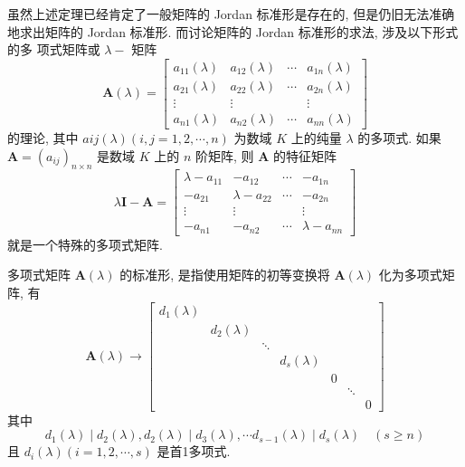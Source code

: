 \par 虽然上述定理已经肯定了一般矩阵的 Jordan 标准形是存在的, 但是仍旧无法准确
地求出矩阵的 Jordan 标准形. 而讨论矩阵的 Jordan 标准形的求法, 涉及以下形式的多
项式矩阵或 $\lambda -$ 矩阵
$$
    \bm{A}(\lambda) = \begin{bmatrix}
        a_{11}(\lambda) & a_{12}(\lambda) & \cdots & a_{1n}(\lambda) \\
        a_{21}(\lambda) & a_{22}(\lambda) & \cdots & a_{2n}(\lambda) \\
        \vdots          & \vdots          &        & \vdots          \\
        a_{n1}(\lambda) & a_{n2}(\lambda) & \cdots & a_{nn}(\lambda)
    \end{bmatrix}
$$
的理论, 其中 $a{ij}(\lambda)(i, j = 1, 2, \cdots, n)$ 为数域 $K$ 上的纯量 $\lambda$ 的多项式. 如果 $\bm{A} = (a_{ij})_{n\times n}$
是数域 $K$ 上的 $n$ 阶矩阵, 则 $\bm{A}$ 的特征矩阵
$$
    \lambda\bm{I} - \bm{A} = \begin{bmatrix}
        \lambda - a_{11} & -a_{12}          & \cdots & -a_{1n}          \\
        -a_{21}          & \lambda - a_{22} & \cdots & -a_{2n}          \\
        \vdots           & \vdots           &        & \vdots           \\
        -a_{n1}          & -a_{n2}          & \cdots & \lambda - a_{nn}
    \end{bmatrix}
$$
就是一个特殊的多项式矩阵.
\par 多项式矩阵 $\bm{A}(\lambda)$ 的标准形, 是指使用矩阵的初等变换将 $\bm{A}(\lambda)$ 化为多项式矩阵, 有
$$
    \bm{A}(\lambda) \to \begin{bmatrix}
        d_1(\lambda) &              &        &              &   &        &   \\
                     & d_2(\lambda) &        &              &   &        &   \\
                     &              & \ddots &              &   &        &   \\
                     &              &        & d_s(\lambda) &   &        &   \\
                     &              &        &              & 0 &        &   \\
                     &              &        &              &   & \ddots &   \\
                     &              &        &              &   &        & 0
    \end{bmatrix}
$$
其中
$$
    d_1(\lambda) \mid d_2(\lambda), d_2(\lambda) \mid d_3(\lambda), \cdots d_{s-1}(\lambda) \mid d_s(\lambda) \quad (s \geqslant n)
$$
且 $d_i(\lambda)(i = 1, 2, \cdots, s)$ 是首1多项式.

